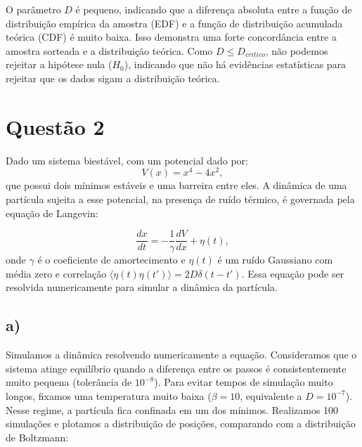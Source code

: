 \documentclass[a4paper, 12pt]{article}
\begin{document}
O parâmetro \(D\) é pequeno, indicando que a diferença absoluta entre a função de distribuição empírica da amostra (EDF) e a função de distribuição acumulada teórica (CDF) é muito baixa. Isso demonstra uma forte concordância entre a amostra sorteada e a distribuição teórica. Como \(D \leq D_{critico}\), não podemos rejeitar a hipótese nula (\(H_0\)), indicando que não há evidências estatísticas para rejeitar que os dados sigam a distribuição teórica.

\section*{Questão 2}

Dado um sistema biestável, com um potencial dado por:
\begin{equation}
V(x) = x^4 - 4x^2,
\end{equation}
que possui dois mínimos estáveis e uma barreira entre eles. A dinâmica de uma partícula sujeita a esse potencial, na presença de ruído térmico, é governada pela equação de Langevin:

\begin{equation}
\frac{dx}{dt} = -\frac{1}{\gamma} \frac{dV}{dx} + \eta(t),
\end{equation}
onde \(\gamma\) é o coeficiente de amortecimento e \(\eta(t)\) é um ruído Gaussiano com média zero e correlação \(\langle \eta(t) \eta(t') \rangle = 2D \delta(t - t')\). Essa equação pode ser resolvida numericamente para simular a dinâmica da partícula.

\subsection*{a)}

Simulamos a dinâmica resolvendo numericamente a equação. Consideramos que o sistema atinge equilíbrio quando a diferença entre os passos é consistentemente muito pequena (tolerância de \(10^{-8}\)). Para evitar tempos de simulação muito longos, fixamos uma temperatura muito baixa (\(\beta = 10\), equivalente a \(D = 10^{-7}\)). Nesse regime, a partícula fica confinada em um dos mínimos. Realizamos 100 simulações e plotamos a distribuição de posições, comparando com a distribuição de Boltzmann:
\end{document}
